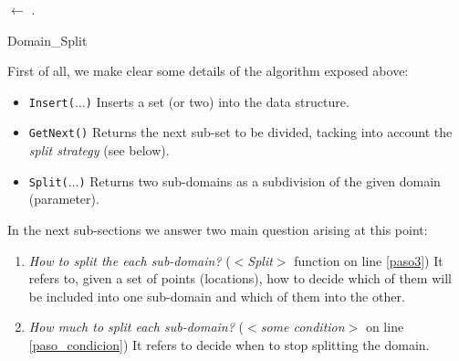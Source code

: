 \incmargin{1.4em}
\linesnumbered
\begin{algorithm}[H]
\dontprintsemicolon
\SetLine
{}

\BlankLine

\A $\leftarrow$ \Uni\;
\Q .\Insert{\A}\;
\caption{Domain\_Split}
\label{algo}
\end{algorithm}

First of all, we make clear some details of the algorithm exposed above:

\begin{itemize}
\item \texttt{Insert($\dots$)} Inserts a set (or two) into the data structure. %
\item \texttt{GetNext()} Returns the next sub-set to be divided, tacking into account the {\it split strategy} (see below).
\item \texttt{Split($\dots$)} Returns two sub-domains as a subdivision of the given domain (parameter).
\end{itemize}

In the next sub-sections we answer two main question arising at this point:

\begin{enumerate}
\item \textit{How to split the each sub-domain?} ($<$\emph{Split}$>$ function on line \ref{paso3}) It refers to, given a set of points (locations), how to decide which of them will be included into one sub-domain and which of them into the other.
\item \textit{How much to split each sub-domain?} ($<$\emph{some condition}$>$ on line \ref{paso_condicion}) It refers to decide when to stop splitting the domain.
\end{enumerate}

